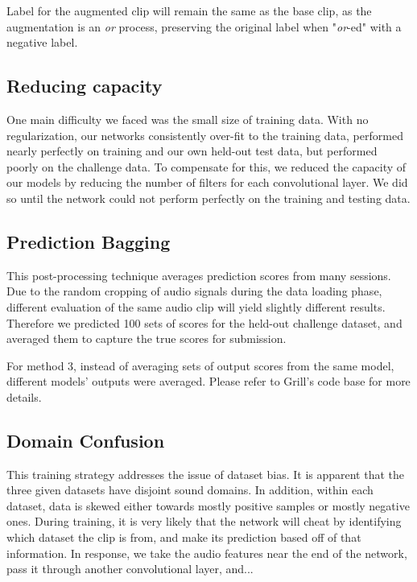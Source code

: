 \documentclass[10pt,twocolumn,letterpaper]{article}
\begin{document}
Label for the augmented clip will remain the same as the base clip, as the
augmentation is an \textit{or} process, preserving the original label when 
"\textit{or}-ed" with a negative label.

\subsection{Reducing capacity}

One main difficulty we faced was the small size of training data. With no
regularization, our networks consistently over-fit to the training data,
performed nearly perfectly on training and our own held-out test data, but
performed poorly on the challenge data. To compensate for this, we reduced
the capacity of our models by reducing the number of filters for each
convolutional layer. We did so until the network could not perform
perfectly on the training and testing data.

\subsection{Prediction Bagging}

This post-processing technique averages prediction scores from many
sessions. Due to the random cropping of audio signals during the data
loading phase, different evaluation of the same audio clip will yield
slightly different results. Therefore we predicted 100 sets of scores for the
held-out challenge dataset, and averaged them to capture the true scores for
submission.

For method 3, instead of averaging sets of output scores from the same
model, different models' outputs were averaged. Please refer to Grill's
code base\cite{winning_blog} for more details.

\subsection{Domain Confusion}


This training strategy addresses the issue of dataset bias. It is apparent
that the three given datasets have disjoint sound domains. In addition,
within each dataset, data is skewed either towards mostly positive samples
or mostly negative ones. During training, it is very likely that the
network will cheat by identifying which dataset the clip is from, and make
its prediction based off of that information. In response, we take the
audio features near the end of the network, pass it through another
convolutional layer, and... 
\end{document}
